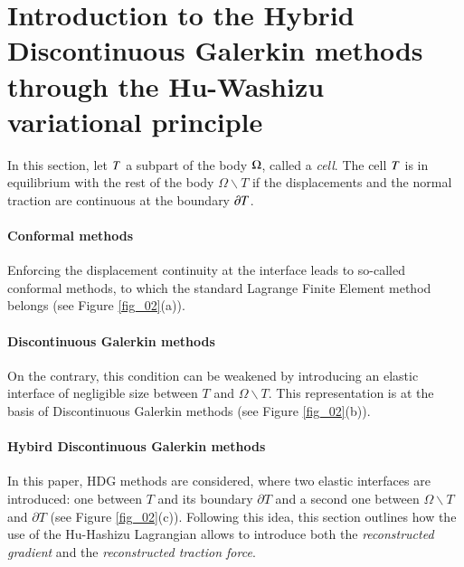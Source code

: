 \section{Introduction to the Hybrid Discontinuous Galerkin methods through the Hu-Washizu variational principle}
\label{sec_appendix_composite_demo}

In this section, let $T$ a subpart of the body \(\Omega\), called a \textit{cell}.
The cell $T$ is in
equilibrium with the rest of the body \(\Omega\backslash T\) if the
displacements and the normal traction are continuous at the boundary
$\partial T{}$.

\paragraph{Conformal methods} Enforcing the displacement continuity at the interface leads to
so-called conformal methods, to which the standard Lagrange Finite Element
method belongs (see Figure \ref{fig_02}(a)).

\paragraph{Discontinuous Galerkin methods} On
the contrary, this condition can be weakened by introducing an elastic
interface of negligible size between \(T\) and \(\Omega\backslash T\).
This representation is at the basis of Discontinuous Galerkin methods
(see Figure \ref{fig_02}(b)).

\paragraph{Hybird Discontinuous Galerkin methods} In
this paper, HDG methods are considered,
where two elastic interfaces are introduced: one between \(T\) and its
boundary \(\partial T\) and a second one between \(\Omega\backslash T\)
and \(\partial T\) (see Figure \ref{fig_02}(c)).
Following this idea,
this section outlines how the use of the Hu-Hashizu Lagrangian allows to
introduce both the
\textit{reconstructed gradient} and the \textit{reconstructed traction force}.

